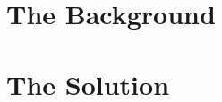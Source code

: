 






\pagestyle{scrheadings} %

\cleardoublepage %

\cleardoublepage


\cleardoublepage %



\part{The Background} %







\part{The Solution}

